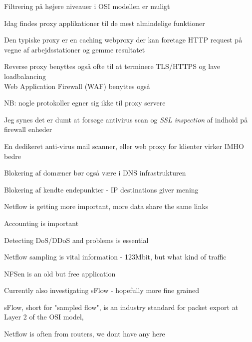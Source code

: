 \documentclass[Screen16to9,17pt]{foils}
\begin{document}

\begin{list1}
\item Filtrering på højere niveauer i OSI modellen er muligt
\item Idag findes proxy applikationer til de mest almindelige
  funktioner
\item Den typiske proxy er en caching webproxy der kan foretage HTTP
  request på vegne af arbejdsstationer og gemme resultatet
\item Reverse proxy benyttes også ofte til at terminere TLS/HTTPS og lave loadbalancing\\
Web Application Firewall (WAF) benyttes også
\item NB: nogle protokoller egner sig ikke til proxy servere
\item Jeg synes det er dumt at forsøge antivirus scan og \emph{SSL inspection} af indhold på firewall enheder
\item En dedikeret anti-virus mail scanner, eller web proxy for klienter virker IMHO bedre
\item Blokering af domæner bør også være i DNS infrastrukturen
\item Blokering af kendte endepunkter - IP destinations giver mening
\end{list1}



\begin{list2}
\item Netflow is getting more important, more data share the same links
\item Accounting is important
\item Detecting DoS/DDoS and problems is essential
\item Netflow sampling is vital information - 123Mbit, but what kind of traffic
\item NFSen is an old but free application
\item Currently also investigating sFlow - hopefully more fine grained
\item sFlow, short for "sampled flow", is an industry standard for packet export at Layer 2 of the OSI model, \\
\end{list2}

\centerline{Netflow is often from routers, we dont have any here}
\end{document}
